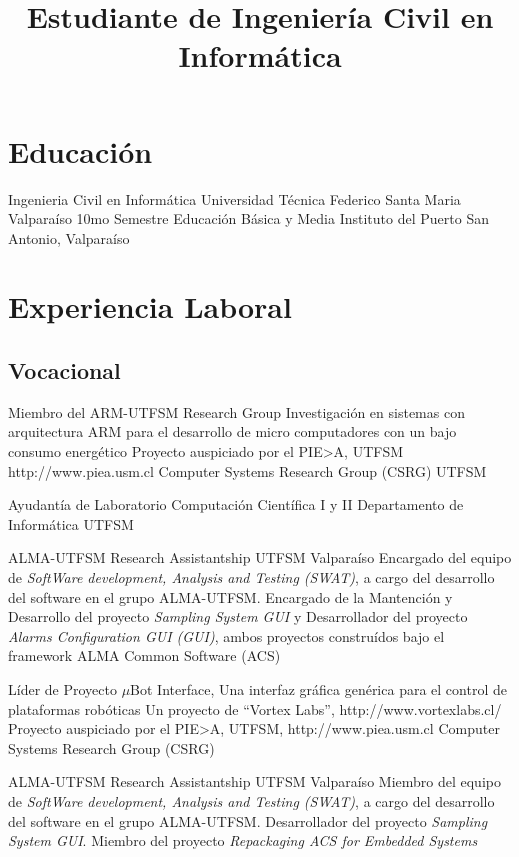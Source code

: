 \documentclass[11pt,a4paper]{moderncv}
\title{\large Estudiante de Ingeniería Civil en Informática}               %
\begin{document}
\maketitle

\section{Educación}
		{Ingenieria Civil en Informática}
		{Universidad Técnica Federico Santa Maria}
		{Valparaíso}
		{10mo Semestre}
		{}
		{Educación Básica y Media}
		{Instituto del Puerto}
		{San Antonio, Valparaíso}
		{}
		{}

\section{Experiencia Laboral}

\subsection{Vocacional}

    {Miembro del ARM-UTFSM Research Group}
    {Investigación en sistemas con arquitectura ARM para el desarrollo de micro computadores con un bajo consumo energético}
	{Proyecto auspiciado por el PIE>A, UTFSM}
	{http://www.piea.usm.cl}
    {Computer Systems Research Group (CSRG)}
    {UTFSM}

    {Ayudantía de Laboratorio}
    {Computación Científica I y II}
    {Departamento de Informática}
	{UTFSM}
    {}

		{ALMA-UTFSM Research Assistantship}
		{UTFSM}
		{Valparaíso}
		{Encargado del equipo de \emph{SoftWare development, Analysis and Testing (SWAT)}, a cargo del desarrollo del software en el grupo ALMA-UTFSM. 
Encargado de la Mantención y Desarrollo del proyecto \emph{Sampling System GUI} y Desarrollador del proyecto \emph{Alarms Configuration GUI (GUI)},
ambos proyectos construídos bajo el framework ALMA Common Software (ACS)}
		{}

    {Líder de Proyecto}
    {$\mu$Bot Interface, Una interfaz gráfica genérica para el control de plataformas robóticas}
    {Un proyecto de ``Vortex Labs'', http://www.vortexlabs.cl/}
    {Proyecto auspiciado por el PIE>A, UTFSM, http://www.piea.usm.cl}
    {Computer Systems Research Group (CSRG)}

		{ALMA-UTFSM Research Assistantship}
		{UTFSM}
		{Valparaíso}
		{Miembro del equipo de \emph{SoftWare development, Analysis and Testing (SWAT)}, a cargo del desarrollo del software en el grupo ALMA-UTFSM. 
Desarrollador del proyecto \emph{Sampling System GUI}. Miembro del proyecto \emph{Repackaging ACS for Embedded Systems}}
		{}
\end{document}
